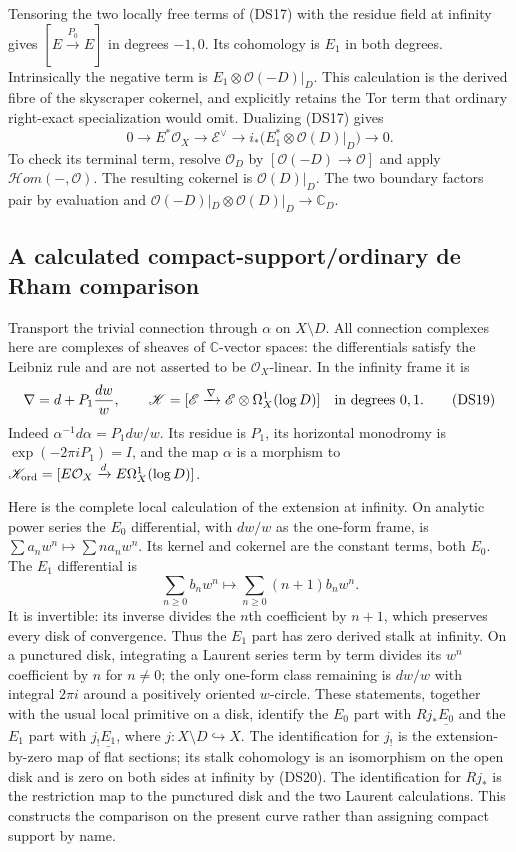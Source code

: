 Tensoring the two locally free terms of (DS17) with the residue field
at infinity gives $[E\xrightarrow{P_0}E]$ in degrees $-1,0$.
Its cohomology is $E_1$ in both degrees.  Intrinsically the negative
term is $E_1\otimes\mathcal O(-D)|_D$.  This calculation is the
derived fibre of the skyscraper cokernel, and explicitly retains the
Tor term that ordinary right-exact specialization would omit.
Dualizing (DS17) gives
\[
 0\to E^*\mathcal O_X\to\mathscr E^\vee
 \to i_*\bigl(E_1^*\otimes\mathcal O(D)|_D\bigr)\to0.
 \tag{DS18}
\]
To check its terminal term, resolve $\mathcal O_D$ by
$[\mathcal O(-D)\to\mathcal O]$ and apply $\mathcal Hom(-,\mathcal O)$.
The resulting cokernel is $\mathcal O(D)|_D$.
The two boundary factors pair by evaluation and
$\mathcal O(-D)|_D\otimes\mathcal O(D)|_D\to\mathbb C_D$.

\subsection{A calculated compact-support/ordinary de Rham comparison}

Transport the trivial connection through $\alpha$ on $X\setminus D$.
All connection complexes here are complexes of sheaves of
$\mathbb C$-vector spaces: the differentials satisfy the Leibniz
rule and are not asserted to be $\mathcal O_X$-linear.
In the infinity frame it is
\[
 \nabla=d+P_1\frac{dw}{w},\qquad
 \mathscr K=[\mathscr E\xrightarrow{\nabla}
                 \mathscr E\otimes\Omega_X^1(\log D)]
 \quad\hbox{in degrees }0,1.
 \tag{DS19}
\]
Indeed $\alpha^{-1}d\alpha=P_1dw/w$.  Its residue is $P_1$, its
horizontal monodromy is $\exp(-2\pi iP_1)=I$, and the map $\alpha$
is a morphism to
$\mathscr K_{\rm ord}=[E\mathcal O_X\xrightarrow d
E\Omega_X^1(\log D)]$.

Here is the complete local calculation of the extension at infinity.
On analytic power series the $E_0$ differential, with $dw/w$ as the
one-form frame, is
$\sum a_nw^n\mapsto\sum n a_nw^n$.  Its kernel and cokernel are
the constant terms, both $E_0$.  The $E_1$ differential is
\[
 \sum_{n\geq0}b_nw^n\longmapsto
 \sum_{n\geq0}(n+1)b_nw^n.
 \tag{DS20}
\]
It is invertible: its inverse divides the $n$th coefficient by $n+1$,
which preserves every disk of convergence.  Thus the $E_1$ part has
zero derived stalk at infinity.  On a punctured disk, integrating a
Laurent series term by term divides its $w^n$ coefficient by $n$ for
$n\ne0$; the only one-form class remaining is $dw/w$ with integral
$2\pi i$ around a positively oriented $w$-circle.  These statements,
together with the usual local primitive on a disk, identify the
$E_0$ part with $Rj_*\underline{E_0}$ and the $E_1$ part with
$j_!\underline{E_1}$, where $j:X\setminus D\hookrightarrow X$.
The identification for $j_!$ is the extension-by-zero map of flat
sections; its stalk cohomology is an isomorphism on the open disk and
is zero on both sides at infinity by (DS20).  The identification for
$Rj_*$ is the restriction map to the punctured disk and the two
Laurent calculations.  This constructs the comparison on the present
curve rather than assigning compact support by name.

